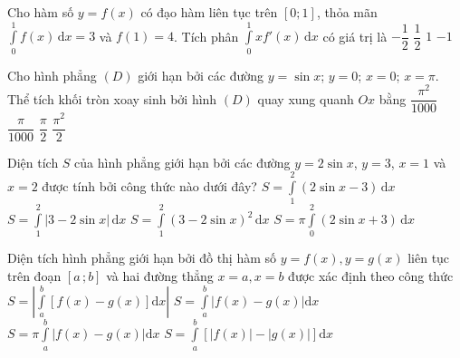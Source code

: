 \begin{ex}%
Cho hàm số $y=f(x)$ có đạo hàm liên tục trên $[0;1]$, thỏa mãn $\displaystyle\int\limits_0^1{f(x)\mathrm{\,d}x=3}$ và $f(1)=4$. Tích phân $\displaystyle\int\limits_0^1{xf'(x)\mathrm{\,d}x}$ có giá trị là
\choice
{$-\dfrac{1}{2}$}
{$\dfrac{1}{2}$}
{\True $1$}
{$-1$}
\end{ex}

\begin{ex}%
Cho hình phẳng $(D)$ giới hạn bởi các đường $ y=\sin x$; $ y=0$; $ x=0$; $ x=\pi $. Thể tích khối tròn xoay sinh bởi hình $(D)$ quay xung quanh $ Ox$ bằng
\choice
{$\dfrac{\pi ^2}{1000}$}
{$\dfrac{\pi}{1000}$}
{$\dfrac{\pi}{2}$}
{\True $\dfrac{\pi ^2}{2}$}
\end{ex}

\begin{ex}%
Diện tích $S$ của hình phẳng giới hạn bởi các đường $y=2\sin x$, $y=3$, $x=1$ và $x=2$ được tính bởi công thức nào dưới đây?
\choice
{$S=\displaystyle\int\limits_1^2(2\sin x-3)\mathrm{\,d}x$}
{\True $S=\displaystyle\int\limits_1^2|3-2\sin x|\mathrm{\,d}x$}
{$S=\displaystyle\int\limits_1^2(3-2\sin x)^2\mathrm{\,d}x$}
{$S=\pi\displaystyle\int\limits_0^2(2\sin x+3)\mathrm{\,d}x$}
\end{ex}

\begin{ex}%

Diện tích hình phẳng giới hạn bởi đồ thị hàm số $y=f\left( x \right),y=g\left( x \right)$ liên tục trên đoạn $\left[ a\,;b \right]$ và hai đường thẳng $x=a,x=b$ được xác định theo công thức
\choice
{ $S=\left| \int\limits_a^b{\left[ f\left( x \right)-g\left( x \right) \right]\text{d}x} \right|$}
{\True $S=\int\limits_a^b{\left| f\left( x \right)-g\left( x \right) \right|\text{d}x}$}
{ $S=\pi \int\limits_a^b{\left| f\left( x \right)-g\left( x \right) \right|\text{d}x}$}
{ $S=\int\limits_a^b{\left[ \left| f\left( x \right) \right|-\left| g\left( x \right) \right| \right]\text{d}x}$}
\end{ex}

